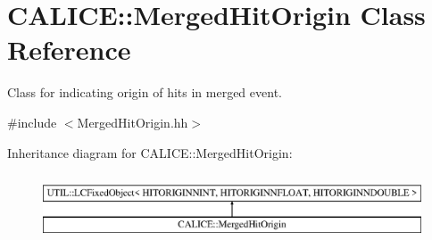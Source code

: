 \section{C\-A\-L\-I\-C\-E\-:\-:Merged\-Hit\-Origin Class Reference}
\label{classCALICE_1_1MergedHitOrigin}


Class for indicating origin of hits in merged event.  




{\ttfamily \#include $<$Merged\-Hit\-Origin.\-hh$>$}

Inheritance diagram for C\-A\-L\-I\-C\-E\-:\-:Merged\-Hit\-Origin\-:\begin{figure}[H]
\begin{center}
\leavevmode
\includegraphics[height=2.000000cm]{classCALICE_1_1MergedHitOrigin}
\end{center}
\end{figure}
